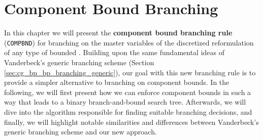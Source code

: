 \chapter{Component Bound Branching}\label{ch:cmpbnd}
In this chapter we will present the \textbf{component bound branching rule} (\texttt{COMPBND}) for branching on the master variables of the discretized reformulation of any type of bounded \IP{}. Building upon the same fundamental ideas of Vanderbeck's generic branching scheme (Section \ref{sec:cg_bp_bp_branching_generic}), our goal with this new branching rule is to provide a simpler alternative to branching on component bounds. In the following, we will first present how we can enforce component bounds in such a way that leads to a binary branch-and-bound search tree. Afterwards, we will dive into the algorithm responsible for finding suitable branching decisions, and finally, we will highlight notable similarities and differences between Vanderbeck's generic branching scheme and our new approach.



